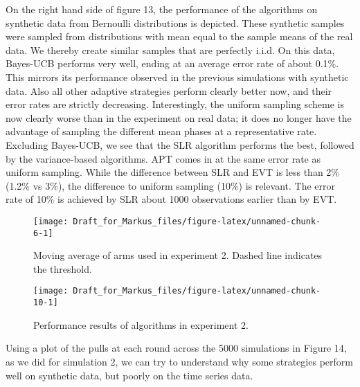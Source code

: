 \documentclass[11pt,]{article}
\begin{document}
On the right hand side of figure 13, the performance of the algorithms
on synthetic data from Bernoulli distributions is depicted. These
synthetic samples were sampled from distributions with mean equal to the
sample means of the real data. We thereby create similar samples that
are perfectly i.i.d. On this data, Bayes-UCB performs very well, ending
at an average error rate of about 0.1\%. This mirrors its performance
observed in the previous simulations with synthetic data. Also all other
adaptive strategies perform clearly better now, and their error rates
are strictly decreasing. Interestingly, the uniform sampling scheme is
now clearly worse than in the experiment on real data; it does no longer
have the advantage of sampling the different mean phases at a
representative rate. Excluding Bayes-UCB, we see that the SLR algorithm
performs the best, followed by the variance-based algorithms. APT comes
in at the same error rate as uniform sampling. While the difference
between SLR and EVT is less than 2\% (1.2\% vs 3\%), the difference to
uniform sampling (10\%) is relevant. The error rate of 10\% is achieved
by SLR about 1000 observations earlier than by EVT.

\begin{figure}

{\centering \texttt{[image: Draft\_for\_Markus\_files/figure-latex/unnamed-chunk-6-1]} 

}

\caption{Moving average of arms used in experiment 2. Dashed line indicates the threshold.}\label{fig:unnamed-chunk-6}
\end{figure}

\begin{figure}

{\centering \texttt{[image: Draft\_for\_Markus\_files/figure-latex/unnamed-chunk-10-1]} 

}

\caption{Performance results of algorithms in experiment 2.}\label{fig:unnamed-chunk-10}
\end{figure}

Using a plot of the pulls at each round across the 5000 simulations in
Figure 14, as we did for simulation 2, we can try to understand why some
strategies perform well on synthetic data, but poorly on the time series
data.
\end{document}
